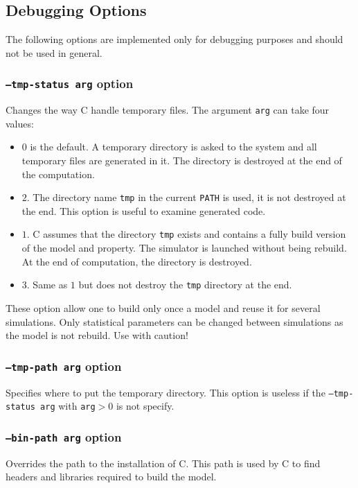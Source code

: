 \documentclass{article}
\newcommand{\cosmos}{\mbox{\textup{C}\scalebox{0.75}{{\textsc{OSMOS}}}}}
\begin{document}
\subsection{Debugging Options}
The following options are implemented only for debugging purposes and
should not be used in general.

\subsubsection{\texttt{--tmp-status arg} option}
Changes the way \cosmos{} handle temporary files. The argument \texttt{arg}
can take four values: 
\begin{itemize}
\item $0$ is the default. A temporary directory is asked to the system and
  all temporary files are generated in it. The directory is destroyed
  at the end of the computation.
\item $2$. The directory name \texttt{tmp} in the current
  \texttt{PATH} is used, it is not destroyed at the end. This option
  is useful to examine generated code.
\item $1$. \cosmos{} assumes that the directory \texttt{tmp} exists
  and contains a fully build version of the model and property. The
  simulator is launched without being rebuild. At the end of computation,
  the directory is destroyed.
\item $3$. Same as $1$ but does not destroy the \texttt{tmp} directory
  at the end.
\end{itemize}
These option allow one to build only once a model and reuse it for
several simulations. Only statistical parameters can be changed between simulations
as the model is not rebuild. Use with caution!

\subsubsection{\texttt{--tmp-path arg} option}
Specifies where to put the temporary directory. This option is useless
if the \texttt{--tmp-status arg} with \texttt{arg}$>0$ is not specify.

\subsubsection{\texttt{--bin-path arg} option}
Overrides the path to the installation of \cosmos{}. This path is used
by \cosmos{} to find headers and libraries required to build the model.
\end{document}
